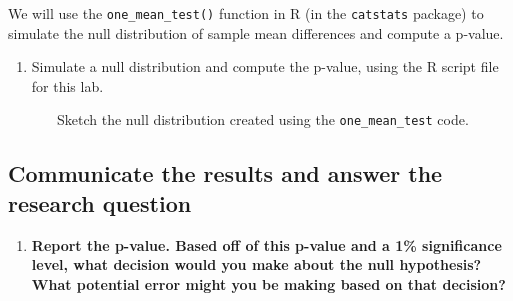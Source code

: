 \documentclass[
]{report}
\newenvironment{Shaded}{\begin{snugshade}}{\end{snugshade}}
\newcommand{\AttributeTok}[1]{\textcolor[rgb]{0.13,0.29,0.53}{#1}}
\newcommand{\CommentTok}[1]{\textcolor[rgb]{0.56,0.35,0.01}{\textit{#1}}}
\newcommand{\DecValTok}[1]{\textcolor[rgb]{0.00,0.00,0.81}{#1}}
\newcommand{\FloatTok}[1]{\textcolor[rgb]{0.00,0.00,0.81}{#1}}
\newcommand{\FunctionTok}[1]{\textcolor[rgb]{0.13,0.29,0.53}{\textbf{#1}}}
\newcommand{\NormalTok}[1]{#1}
\newcommand{\SpecialCharTok}[1]{\textcolor[rgb]{0.81,0.36,0.00}{\textbf{#1}}}
\newcommand{\StringTok}[1]{\textcolor[rgb]{0.31,0.60,0.02}{#1}}
\providecommand{\tightlist}{%
  \setlength{\itemsep}{0pt}\setlength{\parskip}{0pt}}
\begin{document}
We will use the \texttt{one\_mean\_test()} function in R (in the \texttt{catstats} package) to simulate the null distribution of sample mean differences and compute a p-value.

\newpage

\begin{enumerate}
\def\labelenumi{\arabic{enumi}.}
\setcounter{enumi}{9}
\tightlist
\item
  Simulate a null distribution and compute the p-value, using the R script file for this lab.
\end{enumerate}

\begin{Shaded}
\end{Shaded}

~~~~~~~Sketch the null distribution created using the \texttt{one\_mean\_test} code.

\vspace{1.5in}

\subsection*{Communicate the results and answer the research question}\label{communicate-the-results-and-answer-the-research-question-2}

\begin{enumerate}
\def\labelenumi{\arabic{enumi}.}
\setcounter{enumi}{10}
\tightlist
\item
  \textbf{Report the p-value. Based off of this p-value and a 1\% significance level, what decision would you make about the null hypothesis? What potential error might you be making based on that decision?}
\end{enumerate}
\end{document}
